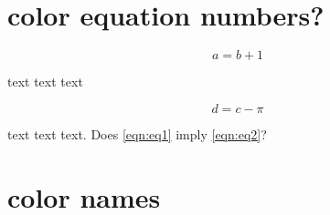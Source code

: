 \documentclass[openany]{memoir}
\newcommand{\HRule}[1]{\hfill \rule{0.2\linewidth}{#1}} %
\begin{document}
%
%
%		
%		
%
%
%
%
%
\section{color equation numbers?}

\ccbyncnd

\begin{equation}\label{eqn:eq1}
a = b + 1
\end{equation}

text text text

\begin{equation}\label{eqn:eq2}
d = c - \pi
\end{equation}

text text text.  Does \ref{eqn:eq1} imply \ref{eqn:eq2}?

\section{color names}
\end{document}
